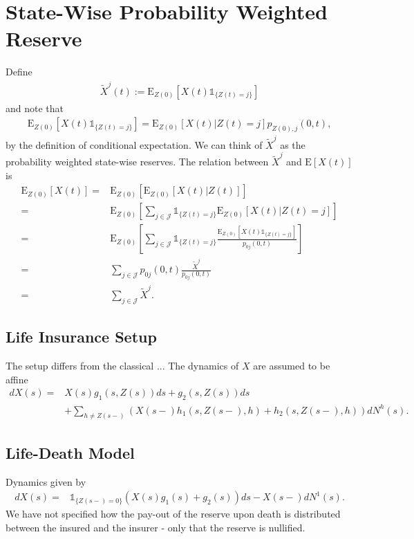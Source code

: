 \documentclass[12pt]{article}
\newcommand{\E}{\text{E}}
\newcommand{\indic}[1]{\mathds{1}_{ \{ #1 \} }}
\begin{document}
\section*{State-Wise Probability Weighted Reserve}
Define
\begin{align*}
\tilde{X}^j(t):=\E_{Z(0)}[X(t)\indic{Z(t)=j}]
\end{align*}
and note that
\begin{align}
\E_{Z(0)}[X(t)\indic{Z(t)=j}]= \E_{Z(0)}[X(t)|Z(t)=j]p_{Z(0),j}(0,t), \label{eq:1}
\end{align}
by the definition of conditional expectation. We can think of $\tilde{X}^j$ as the probability weighted state-wise reserves. The relation between $\tilde{X}^j$ and $\E[X(t)]$ is
\begin{align*}
\E_{Z(0)}[X(t)] =& \E_{Z(0)}[\E_{Z(0)} [ X(t)|Z(t)]] 
\\
=&
\E_{Z(0)} \left[ \sum_{j\in \mathcal{J}} \indic{Z(t)=j} \E_{Z(0)} [ X(t)|Z(t)=j] \right]
\\
=&
\E_{Z(0)} \left[ \sum_{j\in \mathcal{J}} \indic{Z(t)=j} \frac{\E_{Z(0)}[X(t)\indic{Z(t)=j}]}{p_{0j}(0,t)} \right]
\\
=&
\sum_{j\in \mathcal{J}} p_{0j}(0,t) \frac{ \tilde{X}^j}{p_{0j}(0,t)}
\\
=&
\sum_{j\in \mathcal{J}} \tilde{X}^j.
\end{align*}

\subsection*{Life Insurance Setup}
The setup differs from the classical ...
The dynamics of $X$ are assumed to be affine
\begin{align*}
dX(s)=&X(s)g_1(s,Z(s))ds+g_2(s,Z(s))ds\\
&+\sum_{h\neq Z(s-)} \left( X(s-)h_1(s,Z(s-),h)+ h_2(s,Z(s-),h)\right) dN^h(s).
\end{align*}

\subsection*{Life-Death Model}
Dynamics given by
\begin{align*}
dX(s)=& \indic{Z(s-)=0}\left(X(s)g_1(s)+g_2(s) \right) ds - X(s-)dN^1(s).
\end{align*}
We have not specified how the pay-out of the reserve upon death is distributed between the insured and the insurer - only that the reserve is nullified.
\end{document}
